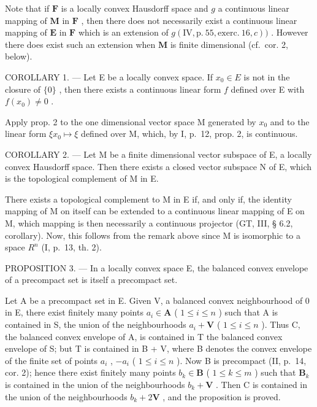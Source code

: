 Note that if \(\mathbf{F}\) is a locally convex Hausdorff space and \(g\) a continuous linear mapping of \(\mathbf{M}\) in \(\mathbf{F}\) , then there does not necessarily exist a continuous linear mapping of \(\mathbf{E}\) in \(\mathbf{F}\) which is an extension of \(g(\mathrm{IV},\mathrm{p.~55},\mathrm{exerc.~16},c))\) . However there does exist such an extension when \(\mathbf{M}\) is finite dimensional (cf.~cor. 2, below).

COROLLARY 1. --- Let E be a locally convex space. If \(x_0 \in E\) is not in the closure of \(\{0\}\) , then there exists a continuous linear form \(f\) defined over E with \(f(x_0) \neq 0\) .

Apply prop. 2 to the one dimensional vector space M generated by \(x_0\) and to the linear form \(\xi x_0 \mapsto \xi\) defined over M, which, by I, p.~12, prop. 2, is continuous.

COROLLARY 2. --- Let M be a finite dimensional vector subspace of E, a locally convex Hausdorff space. Then there exists a closed vector subspace N of E, which is the topological complement of M in E.

There exists a topological complement to M in E if, and only if, the identity mapping of M on itself can be extended to a continuous linear mapping of E on M, which mapping is then necessarily a continuous projector (GT, III, § 6.2, corollary). Now, this follows from the remark above since M is isomorphic to a space \(R^{n}\) (I, p.~13, th. 2).

PROPOSITION 3. --- In a locally convex space E, the balanced convex envelope of a precompact set is itself a precompact set.

Let A be a precompact set in E. Given V, a balanced convex neighbourhood of 0 in E, there exist finitely many points \(a_i \in \mathbf{A}\) ( \(1 \leqslant i \leqslant n\) ) such that A is contained in S, the union of the neighbourhoods \(a_i + \mathbf{V}\) ( \(1 \leqslant i \leqslant n\) ). Thus C, the balanced convex envelope of A, is contained in T the balanced convex envelope of S; but T is contained in B + V, where B denotes the convex envelope of the finite set of points \(a_i\) , \(-a_i\) ( \(1 \leqslant i \leqslant n\) ). Now B is precompact (II, p.~14, cor. 2); hence there exist finitely many points \(b_k \in \mathbf{B}\) ( \(1 \leqslant k \leqslant m\) ) such that \(\mathbf{B}_k\) is contained in the union of the neighbourhoods \(b_k + \mathbf{V}\) . Then C is contained in the union of the neighbourhoods \(b_k + 2\mathbf{V}\) , and the proposition is proved.

